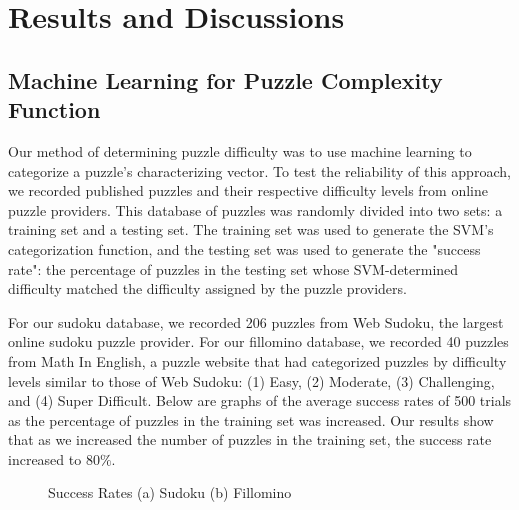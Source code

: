 \section{Results and Discussions}

\subsection{Machine Learning for Puzzle Complexity Function}

Our method of determining puzzle difficulty was to use machine learning to categorize a puzzle's characterizing vector. To test the reliability of this approach, we recorded published puzzles and their respective difficulty levels from online puzzle providers. This database of puzzles was randomly divided into two sets: a training set and a testing set. The training set was used to generate the SVM's categorization function, and the testing set was used to generate the "success rate": the percentage of puzzles in the testing set whose SVM-determined difficulty matched the difficulty assigned by the puzzle providers. 

For our sudoku database, we recorded 206 puzzles from Web Sudoku, the largest online sudoku puzzle provider. For our fillomino database, we recorded 40 puzzles from Math In English, a puzzle website that had categorized puzzles by difficulty levels similar to those of Web Sudoku: (1) Easy, (2) Moderate, (3) Challenging, and (4) Super Difficult. Below are graphs of the average success rates of 500 trials as the percentage of puzzles in the training set was increased. Our results show that as we increased the number of puzzles in the training set, the success rate increased to $80 \%$.

\begin{figure}
     \centering
     \caption{Success Rates (a) Sudoku (b) Fillomino}
\end{figure}

